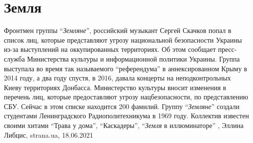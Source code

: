  
 
 
 
 
\chapter{Земля}

Фронтмен группы \enquote{\emph{Земляне}}, российский музыкант Сергей Скачков
попал в список лиц, которые представляют угрозу национальной безопасности
Украины из-за выступлений на оккупированных территориях.  Об этом сообщает
пресс-служба Министерства культуры и информационной политики Украины.  Группа
выступала во время так называемого \enquote{референдума} в аннексированном
Крыму в 2014 году, а два году спустя, в 2016, давала концерты на
неподконтрольных Киеву территориях Донбасса.  Министерство культуры вносит
изменения в перечень лиц, которые предоставляют угрозу нацбезопасности, по
представлению СБУ. Сейчас в этом списке находится 200 фамилий.  Группу
\enquote{\emph{Земляне}} создали студентами Ленинградского Радиополитехникума в
1969 году. Коллектив известен своими хитами \enquote{Трава у дома},
\enquote{Каскадеры}, \enquote{\emph{Земля} в иллюминаторе}
, 
Эллина Либцис, strana.ua, 18.06.2021

